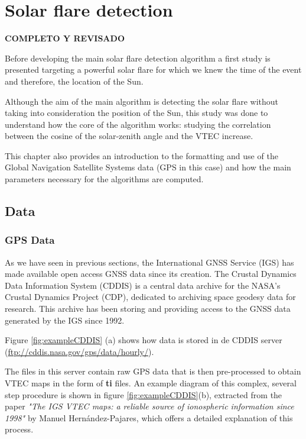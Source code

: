\chapter{Solar flare detection}

\textbf{COMPLETO Y REVISADO}

Before developing the main solar flare detection algorithm a first study is presented targeting a powerful solar flare for which we knew the time of the event and therefore, the location of the Sun.

Although the aim of the main algorithm is detecting the solar flare without taking into consideration the position of the Sun, this study was done to understand how the core of the algorithm works: studying the correlation between the cosine of the solar-zenith angle and the VTEC increase.

This chapter also provides an introduction to the formatting and use of the Global Navigation Satellite Systems data (GPS in this case) and how the main parameters necessary for the algorithms are computed.

\section{Data}

\subsection{GPS Data}

As we have seen in previous sections, the International GNSS Service (IGS) has made available open access GNSS data since its creation. The Crustal Dynamics Data Information System (CDDIS) is a central data archive for the NASA's Crustal Dynamics Project (CDP), dedicated to archiving space geodesy data for research. This archive has been storing and providing access to the GNSS data generated by the IGS since 1992.

Figure \ref{fig:exampleCDDIS} (a) shows how data is stored in de CDDIS server (\url{ftp://cddis.nasa.gov/gps/data/hourly/}).

The files in this server contain raw GPS data that is then pre-processed to obtain VTEC maps in the form of \textbf{ti} files. An example diagram of this complex, several step procedure is shown in figure \ref{fig:exampleCDDIS}(b), extracted from the paper \textit{"The IGS VTEC maps: a reliable source of ionospheric information since 1998"} \cite{hernandez2009igs} by Manuel Hernández-Pajares, which offers a detailed explanation of this process. 

